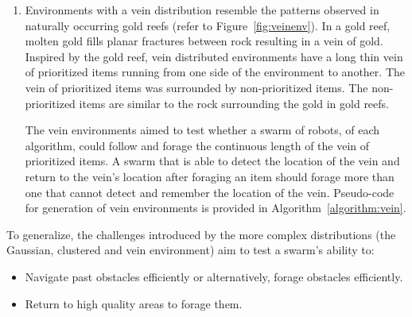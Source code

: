 \begin{enumerate}
\item Environments with a vein distribution resemble the patterns observed in naturally occurring gold reefs \cite{frimmel2002recent} (refer to Figure~\ref{fig:veinenv}). In a gold reef, molten gold fills planar fractures between rock resulting in a vein of gold. Inspired by the gold reef, vein distributed environments have a long thin vein of prioritized items running from one side of the environment to another. The vein of prioritized items was surrounded by non-prioritized items. The non-prioritized items are similar to the rock surrounding the gold in gold reefs.

The vein environments aimed to test whether a swarm of robots, of each algorithm, could follow and forage the continuous length of the vein of prioritized items. A swarm that is able to detect the location of the vein and return to the vein's location after foraging an item should forage more than one that cannot detect and remember the location of the vein.  Pseudo-code for generation of vein environments is provided in Algorithm~\ref{algorithm:vein}.


\end{enumerate} 

To generalize, the challenges introduced by the more complex distributions (the Gaussian, clustered and vein environment) aim to test a swarm's ability to:

\begin{itemize}
\item Navigate past obstacles efficiently or alternatively, forage obstacles efficiently.
\item Return to high quality areas to forage them.
\end{itemize}


